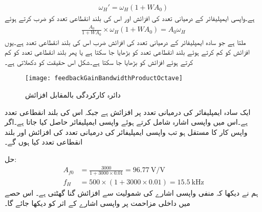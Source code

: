 \begin{align}
\omega_H'=\omega_H \left(1+W A_0 \right)
\end{align}
ہے۔واپسی ایمپلیفائر کے درمیانی تعدد کی افزائش اور اس کی بلند انقطاعی تعدد کو ضرب کرتے ہوئے
\begin{align}
\frac{A_0}{1+W A_0} \times \omega_H \left(1+W A_0 \right) =A_0 \omega_H
\end{align}
ملتا ہے جو سادہ ایمپلیفائر کے درمیانی تعدد کی افزائش ضرب اس کی بلند انقطاعی تعدد ہے۔یوں افزائش کو کم کرتے ہوئے بلند انقطاعی تعدد کو بڑھایا جا سکتا ہے یا پھر بلند انقطاعی تعدد کو کم کرتے ہوئے افزائش کو بڑھایا جا سکتا ہے۔شکل  اس حقیقت کو دکھلاتی ہے۔
\begin{figure}
\centering
\texttt{[image: feedbackGainBandwidthProductOctave]}
\caption{دائرہ کارکردگی بالمقابل افزائش}
\label{شکل_واپسی_دائرہ_بالمقابل_افزائش}
\end{figure}
ایک سادہ ایمپلیفائر کی درمیانی تعدد پر افزائش  ہے جبکہ اس کی بلند انقطاعی تعدد  ہے۔اس میں واپسی اشارہ شامل کرتے ہوئے واپسی ایمپلیفائر حاصل کیا جاتا ہے۔اگر واپس کار کا مستقل  ہو تب واپسی ایمپلیفائر کی درمیانی تعدد کی افزائش اور بلند انقطاعی تعدد کیا ہوں گے۔

حل:
\begin{align*}
A_{f0}&=\frac{3000}{1+3000 \times 0.01}=\SI{96.77}{\volt \per \volt}\\
f_H&=500 \times \left(1+3000 \times 0.01 \right)=\SI{15.5}{\kilo \hertz}
\end{align*}
ہم نے دیکھا کہ منفی واپسی اشارے کی شمولیت سے افزائش  گنا گھٹتی    ہے۔ اس حصے میں داخلی مزاحمت پر واپسی اشارے کے اثر کو دیکھا جائے گا۔

